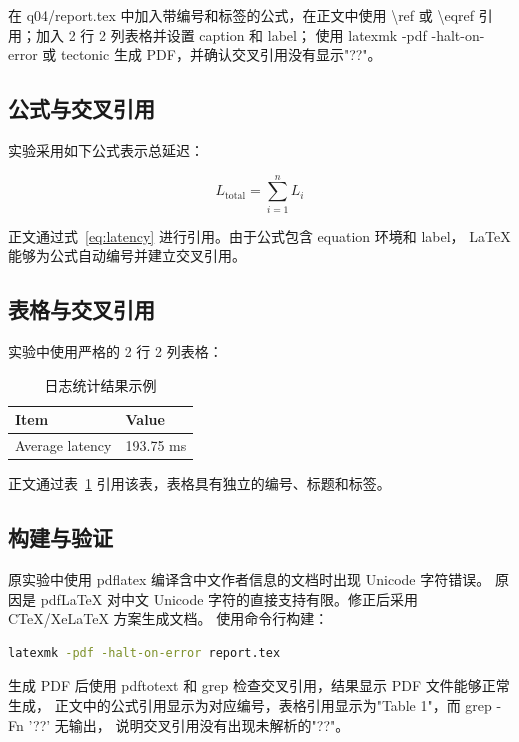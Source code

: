 \documentclass[UTF8]{ctexart}
\begin{document}
在 q04/report.tex 中加入带编号和标签的公式，在正文中使用 \textbackslash ref 或
\textbackslash eqref 引用；加入 2 行 2 列表格并设置 caption 和 label；
使用 latexmk -pdf -halt-on-error 或 tectonic 生成 PDF，并确认交叉引用没有显示"??"。

\subsection{公式与交叉引用}

实验采用如下公式表示总延迟：

\begin{equation}
L_{\mathrm{total}} = \sum_{i=1}^{n} L_i
\label{eq:latency}
\end{equation}

正文通过式~\eqref{eq:latency} 进行引用。由于公式包含 equation 环境和 label，
LaTeX 能够为公式自动编号并建立交叉引用。

\subsection{表格与交叉引用}

实验中使用严格的 2 行 2 列表格：

\begin{table}[H]
\centering
\caption{日志统计结果示例}
\label{tab:result}
\begin{tabular}{ll}
\toprule
Item & Value \\
\midrule
Average latency & 193.75 ms \\
\bottomrule
\end{tabular}
\end{table}

正文通过表~\ref{tab:result} 引用该表，表格具有独立的编号、标题和标签。

\subsection{构建与验证}

原实验中使用 pdflatex 编译含中文作者信息的文档时出现 Unicode 字符错误。
原因是 pdfLaTeX 对中文 Unicode 字符的直接支持有限。修正后采用 CTeX/XeLaTeX 方案生成文档。
使用命令行构建：

\begin{lstlisting}[language=bash]
latexmk -pdf -halt-on-error report.tex
\end{lstlisting}

生成 PDF 后使用 pdftotext 和 grep 检查交叉引用，结果显示 PDF 文件能够正常生成，
正文中的公式引用显示为对应编号，表格引用显示为"Table 1"，而 grep -Fn '??' 无输出，
说明交叉引用没有出现未解析的"??"。
\end{document}
